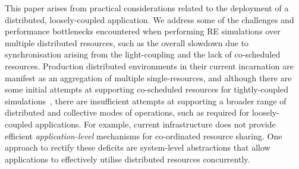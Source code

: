 \documentclass{rspublic}
\newcommand{\alnote}[1]{ {\textcolor{blue} { ***AL: #1 }}}
\newcommand{\jhanote}[1]{ {\textcolor{red} { ***SJ: #1 }}}
\newcommand{\alnote}[1]{}
\newcommand{\jhanote}[1]{}
\begin{document}
This paper arises from practical considerations related to the
deployment of a distributed, loosely-coupled application.  We address
some of the challenges and performance bottlenecks encountered when
performing RE simulations over multiple distributed resources,
such as the overall slowdown due to synchronisation arising from the
light-coupling and the lack of co-scheduled resources. Production
distributed environments in their current incarnation are manifest as
an aggregation of multiple single-resources, and although there are some
initial attempts at supporting co-scheduled resources for
tightly-coupled simulations~\citep{repex_mpig}, there are insufficient
attempts at supporting a broader range of distributed and collective
modes of operations, such as required for loosely-coupled
applications.  For example, current infrastructure does not provide
efficient {\it ap\-pli\-cation-level} mechanisms for co-ordinated resource
sharing. One approach to rectify these deficits are system-level
abstractions that allow applications to effectively utilise
distributed resources concurrently.
\end{document}
